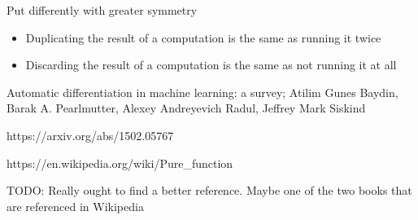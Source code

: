 \documentclass[12pt]{article}
\begin{document}
Put differently with greater symmetry

\begin{itemize}
 \item Duplicating the result of a computation is the same as running
   it twice

 \item Discarding the result of a computation is the same as not
   running it at all
\end{itemize}


\begin{thebibliography}{9}

  Automatic differentiation in machine learning: a survey;
  Atilim Gunes Baydin, Barak A. Pearlmutter, Alexey Andreyevich Radul, Jeffrey Mark Siskind
  
https://arxiv.org/abs/1502.05767
  
  https://en.wikipedia.org/wiki/Pure\_function

  TODO: Really ought to find a better reference.  Maybe one of the two
  books that are referenced in Wikipedia

\end{thebibliography}
\end{document}

